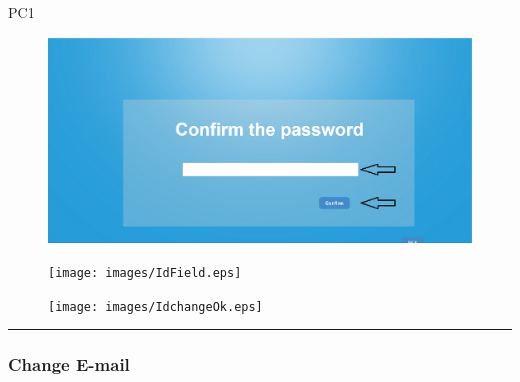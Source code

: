 \begin{lyxlist}{PC1}
\begin{figure}[H]
\centering
\includegraphics[width=170mm]{images/ComfirmField.eps}
\caption{\label{overflow}}
\end{figure}

\begin{figure}[H]
\centering
\texttt{[image: images/IdField.eps]}
\caption{\label{overflow}}
\end{figure}

\begin{figure}[H]
\centering
\texttt{[image: images/IdchangeOk.eps]}
\caption{\label{overflow}}
\end{figure}
\end{lyxlist}
\hrule


\subsubsection{Change E-mail}

